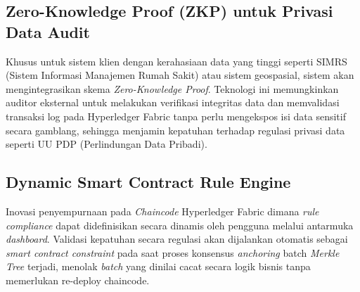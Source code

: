 \subsection{Zero-Knowledge Proof (ZKP) untuk Privasi Data Audit}
Khusus untuk sistem klien dengan kerahasiaan data yang tinggi seperti SIMRS (Sistem Informasi Manajemen Rumah Sakit) atau sistem geospasial, sistem akan mengintegrasikan skema \textit{Zero-Knowledge Proof}. Teknologi ini memungkinkan auditor eksternal untuk melakukan verifikasi integritas data dan memvalidasi transaksi log pada Hyperledger Fabric tanpa perlu mengekspos isi data sensitif secara gamblang, sehingga menjamin kepatuhan terhadap regulasi privasi data seperti UU PDP (Perlindungan Data Pribadi).

\subsection{Dynamic Smart Contract Rule Engine}
Inovasi penyempurnaan pada \textit{Chaincode} Hyperledger Fabric dimana \textit{rule compliance} dapat didefinisikan secara dinamis oleh pengguna melalui antarmuka \textit{dashboard}. Validasi kepatuhan secara regulasi akan dijalankan otomatis sebagai \textit{smart contract constraint} pada saat proses konsensus \textit{anchoring} batch \textit{Merkle Tree} terjadi, menolak \textit{batch} yang dinilai cacat secara logik bisnis tanpa memerlukan re-deploy chaincode.
